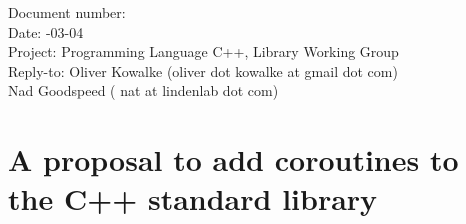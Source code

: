 \documentclass[a4paper,10pt,DIV15]{scrartcl}
\begin{document}
\small
\begin{tabbing}
    Document number: \=  \\
    Date:            -03-04 \\
    Project:         \> Programming Language C++, Library Working Group \\
    Reply-to:        \> Oliver Kowalke (oliver dot kowalke at gmail dot com)\\
                     \> Nad Goodspeed ( nat at lindenlab dot com)\\
\end{tabbing}

\section*{A proposal to add coroutines to the C++ standard library}


\tableofcontents











\end{document}
